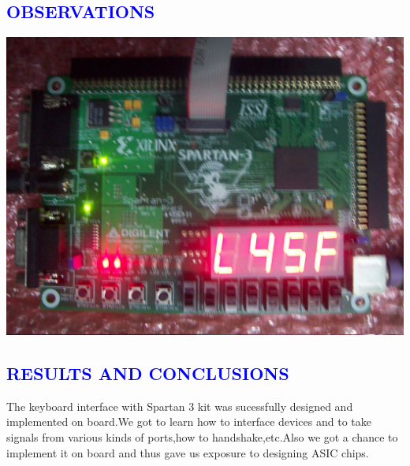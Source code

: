 \documentclass[a4paper,12pt]{report}
\begin{document}
\begin{center}
\chapter{\textcolor{blue}{OBSERVATIONS}}
\begin{center}
 \includegraphics[scale=0.1]{./working_1.JPG}
\end{center}

\end{center}






\begin{center}
\chapter{\textcolor{blue}{RESULTS AND CONCLUSIONS}}\end{center}

\noindent The keyboard interface with Spartan 3 kit was sucessfully designed and implemented on board.We got to learn 
how to interface devices and to take signals from various kinds of ports,how to handshake,etc.Also we got a chance to
implement it on board and thus gave us exposure to designing  ASIC chips.
\end{document}
